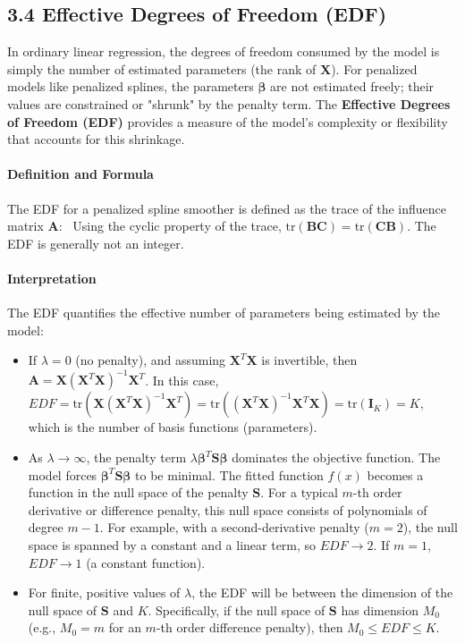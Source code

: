 \documentclass[11pt, a4paper]{article}
\begin{document}
\begin{itemize}
\subsection{3.4 Effective Degrees of Freedom (EDF)}
In ordinary linear regression, the degrees of freedom consumed by the model is simply the number of estimated parameters (the rank of $\mathbf{X}$). For penalized models like penalized splines, the parameters $\boldsymbol{\beta}$ are not estimated freely; their values are constrained or "shrunk" by the penalty term. The \textbf{Effective Degrees of Freedom (EDF)} provides a measure of the model's complexity or flexibility that accounts for this shrinkage.

\paragraph{Definition and Formula}
The EDF for a penalized spline smoother is defined as the trace of the influence matrix $\mathbf{A}$:
\
Using the cyclic property of the trace, $\text{tr}(\mathbf{B}\mathbf{C}) = \text{tr}(\mathbf{C}\mathbf{B})$. The EDF is generally not an integer.

\paragraph{Interpretation}
The EDF quantifies the effective number of parameters being estimated by the model:
\begin{itemize}
 \item If $\lambda = 0$ (no penalty), and assuming $\mathbf{X}^T\mathbf{X}$ is invertible, then $\mathbf{A} = \mathbf{X}(\mathbf{X}^T\mathbf{X})^{-1}\mathbf{X}^T$. In this case, $EDF = \text{tr}(\mathbf{X}(\mathbf{X}^T\mathbf{X})^{-1}\mathbf{X}^T) = \text{tr}((\mathbf{X}^T\mathbf{X})^{-1}\mathbf{X}^T\mathbf{X}) = \text{tr}(\mathbf{I}_K) = K$, which is the number of basis functions (parameters).
 \item As $\lambda \rightarrow \infty$, the penalty term $\lambda \boldsymbol{\beta}^T \mathbf{S} \boldsymbol{\beta}$ dominates the objective function. The model forces $\boldsymbol{\beta}^T \mathbf{S} \boldsymbol{\beta}$ to be minimal. The fitted function $f(x)$ becomes a function in the null space of the penalty $\mathbf{S}$. For a typical $m$-th order derivative or difference penalty, this null space consists of polynomials of degree $m-1$. For example, with a second-derivative penalty ($m=2$), the null space is spanned by a constant and a linear term, so $EDF \rightarrow 2$. If $m=1$, $EDF \rightarrow 1$ (a constant function).
 \item For finite, positive values of $\lambda$, the EDF will be between the dimension of the null space of $\mathbf{S}$ and $K$. Specifically, if the null space of $\mathbf{S}$ has dimension $M_0$ (e.g., $M_0=m$ for an $m$-th order difference penalty), then $M_0 \le EDF \le K$.
\end{itemize}


\end{itemize}
\end{document}
